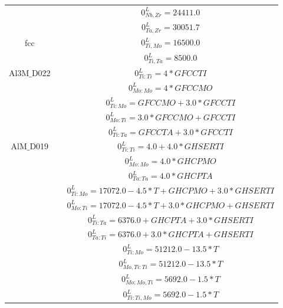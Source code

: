 \begin{longtable}[H]{ c c c }
                  & \cite{Guillermet1991} & $0^\textit{L}_{Nb,Zr} = 24411.0$\\
                  & \cite{Guillermet1995} & $0^\textit{L}_{Ta,Zr} = 30051.7$\\
           fcc & \cite{Ansara1998} & $0^\textit{L}_{Ti,Mo} = 16500.0$\\
                  & \cite{Ansara1998} & $0^\textit{L}_{Ti,Ta} = 8500.0$\\
    Al3M$\_$D022 & \cite{Ansara1998} & $0^\textit{L}_{Ti:Ti} = 4*GFCCTI$\\
                            & \cite{Ansara1998} & $0^\textit{L}_{Mo:Mo} = 4*GFCCMO$\\
                            & \cite{Ansara1998} & $0^\textit{L}_{Ti:Mo} = GFCCMO+3.0*GFCCTI$\\
                            & \cite{Ansara1998} & $0^\textit{L}_{Mo:Ti} = 3.0*GFCCMO+GFCCTI$\\
                            & \cite{Ansara1998} & $0^\textit{L}_{Ti:Ta} = GFCCTA+3.0*GFCCTI$\\
         AlM$\_$D019 & \cite{Ansara1998} & $0^\textit{L}_{Ti:Ti} = 4.0+4.0*GHSERTI$\\
                              & \cite{Ansara1998} & $0^\textit{L}_{Mo:Mo} = 4.0*GHCPMO$\\
                              & \cite{Ansara1998} & $0^\textit{L}_{Ta:Ta} = 4.0*GHCPTA$\\
                              & \cite{Ansara1998} & $0^\textit{L}_{Ti:Mo} = 17072.0-4.5*T+GHCPMO+3.0*GHSERTI$\\
                              & \cite{Ansara1998} & $0^\textit{L}_{Mo:Ti} = 17072.0-4.5*T+3.0*GHCPMO+GHSERTI$\\
                              & \cite{Ansara1998} & $0^\textit{L}_{Ti:Ta} = 6376.0+GHCPTA+3.0*GHSERTI$\\
                              & \cite{Ansara1998} & $0^\textit{L}_{Ta:Ti} = 6376.0+3.0*GHCPTA+GHSERTI$\\
                              & \cite{Ansara1998} & $0^\textit{L}_{Ti:Mo} = 51212.0-13.5*T$\\
                              & \cite{Ansara1998} & $0^\textit{L}_{Mo,Ti:Ti} = 51212.0-13.5*T$\\
                              & \cite{Ansara1998} & $0^\textit{L}_{Mo:Mo,Ti} = 5692.0-1.5*T$\\
                              & \cite{Ansara1998} & $0^\textit{L}_{Ti:Ti,Mo} = 5692.0-1.5*T$\\

\end{longtable}
